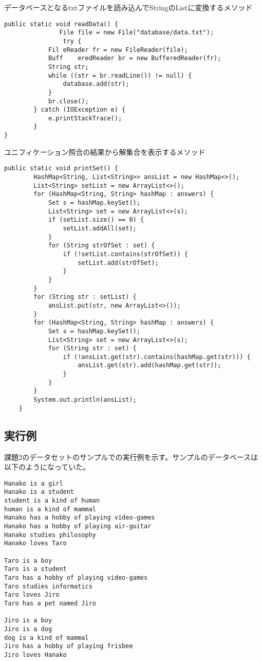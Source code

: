 \documentclass[a4j]{jarticle}
\begin{document}
データベースとなるtxtファイルを読み込んでStringのListに変換するメソッド
\begin{lstlisting}
public static void readData() {
               File file = new File("database/data.txt");
       	        try {
            Fil	eReader fr = new FileReader(file);
            Buff	eredReader br = new BufferedReader(fr);
            String str;
            while ((str = br.readLine()) != null) {
                database.add(str);
            }
            br.close();
        } catch (IOException e) {
            e.printStackTrace();
        }
}
\end{lstlisting}
ユニフィケーション照合の結果から解集合を表示するメソッド
\begin{lstlisting}
public static void printSet() {
        HashMap<String, List<String>> ansList = new HashMap<>();
        List<String> setList = new ArrayList<>();
        for (HashMap<String, String> hashMap : answers) {
            Set s = hashMap.keySet();
            List<String> set = new ArrayList<>(s);
            if (setList.size() == 0) {
                setList.addAll(set);
            }
            for (String strOfSet : set) {
                if (!setList.contains(strOfSet)) {
                    setList.add(strOfSet);
                }
            }
        }
        for (String str : setList) {
            ansList.put(str, new ArrayList<>());
        }
        for (HashMap<String, String> hashMap : answers) {
            Set s = hashMap.keySet();
            List<String> set = new ArrayList<>(s);
            for (String str : set) {
                if (!ansList.get(str).contains(hashMap.get(str))) {
                    ansList.get(str).add(hashMap.get(str));
                }
            }
        }
        System.out.println(ansList);
    }
\end{lstlisting}

\subsection{実行例}
課題2のデータセットのサンプルでの実行例を示す。サンプルのデータベースは以下のようになっていた。
\begin{lstlisting}
Hanako is a girl
Hanako is a student
student is a kind of human
human is a kind of mammal
Hanako has a hobby of playing video-games
Hanako has a hobby of playing air-guitar
Hanako studies philosophy
Hanako loves Taro

Taro is a boy
Taro is a student
Taro has a hobby of playing video-games
Taro studies informatics
Taro loves Jiro
Taro has a pet named Jiro

Jiro is a boy
Jiro is a dog
dog is a kind of mammal
Jiro has a hobby of playing frisbee
Jiro loves Hanako

\end{lstlisting}
\end{document}
